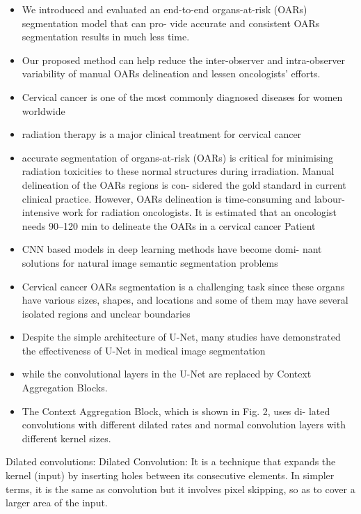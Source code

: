 \documentclass[11pt]{article}
\begin{document}
\begin{itemize}
    \item We introduced and evaluated an end-to-end organs-at-risk (OARs) segmentation model that can pro-
    vide accurate and consistent OARs segmentation results in much less time.
    \item Our proposed method can help reduce the inter-observer and intra-observer variability of manual
    OARs delineation and lessen oncologists’ efforts. 
    \item Cervical cancer is one of the most commonly diagnosed diseases for
    women worldwide
    \item radiation therapy is a major clinical treatment
    for cervical cancer
    \item accurate segmentation of organs-at-risk (OARs)
    is critical for minimising radiation toxicities to these normal structures
    during irradiation. Manual delineation of the OARs regions is con-
    sidered the gold standard in current clinical practice. However, OARs
    delineation is time-consuming and labour-intensive work for radiation
    oncologists. It is estimated that an oncologist needs 90–120 min to
    delineate the OARs in a cervical cancer Patient
    \item CNN based models in deep learning methods have become domi-
    nant solutions for natural image semantic segmentation problems
    \item Cervical cancer OARs segmentation is a challenging task since these
    organs have various sizes, shapes, and locations and some of them may
    have several isolated regions and unclear boundaries
    \item Despite
    the simple architecture of U-Net, many studies have demonstrated the
    effectiveness of U-Net in medical image segmentation
    \item while the convolutional layers in the U-Net are replaced
    by Context Aggregation Blocks.
    \item The Context Aggregation Block, which is shown in Fig. 2, uses di-
    lated convolutions with different dilated rates and normal convolution
    layers with different kernel sizes.
\end{itemize}

Dilated convolutions: Dilated Convolution: It is a technique that expands the kernel (input) by inserting holes between its consecutive elements. In simpler terms, it is the same as convolution but it involves pixel skipping, so as to cover a larger area of the input. 
\end{document}
